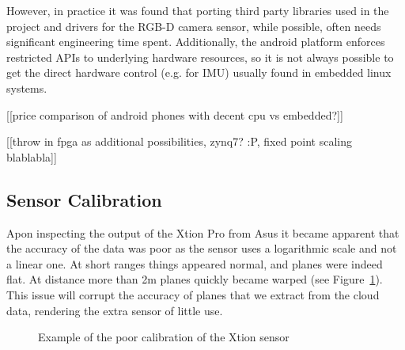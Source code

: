 \documentclass[]{article}
\begin{document}
{However, in practice it was found that porting third party libraries used in the project and drivers for the RGB-D camera sensor, while possible, often needs significant engineering time spent. Additionally, the android platform enforces restricted APIs to underlying hardware resources, so it is not always possible to get the direct hardware control (e.g. for IMU) usually found in embedded linux systems.

[[price comparison of android phones with decent cpu vs embedded?]]

[[throw in fpga as additional possibilities, zynq7? :P, fixed point scaling blablabla]]

\subsection{Sensor Calibration} %
Apon inspecting the output of the Xtion Pro from Asus it became apparent that the accuracy of the data was poor as the sensor uses a logarithmic scale and not a linear one. At short ranges things appeared normal, and planes were indeed flat. At distance more than 2m planes quickly became warped (see Figure~\ref{fig:uncal5m}). This issue will corrupt the accuracy of planes that we extract from the cloud data, rendering the extra sensor of little use. 

\begin{figure}[H]
\centering     %
{} \;
\caption{Example of the poor calibration of the Xtion sensor}
\label{fig:uncal5m}
\end{figure}


}
\end{document}
